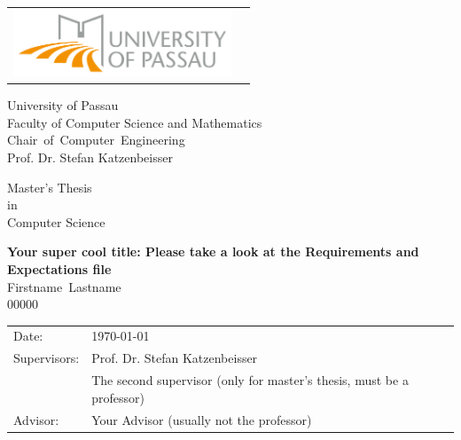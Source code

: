 \documentclass[fontsize=10pt,openright,oneside,paper=a4,BCOR=1cm,numbers=noenddot,english]{scrbook}
\newcommand{\authornamefirst}{Firstname}
\newcommand{\authornamelast}{Lastname}
\newcommand{\matrikelnummer}{00000}
\newcommand{\worktitle}{Your super cool title: Please take a look at the Requirements and Expectations file}
\newcommand{\thesistype}{Master's Thesis}
\newcommand{\courseofstudies}{Computer Science}
\newcommand{\thesisdate}{\today}   %
\newcommand{\thesisprof}{Prof. Dr. Stefan Katzenbeisser}
\newcommand{\thesisproftwo}{The second supervisor (only for master's thesis, must be a professor)}
\newcommand{\chair}{\mbox{Chair of Computer Engineering}}
\newcommand{\advisor}{Your Advisor (usually not the professor)}
\let\epsilon\varepsilon
\begin{document}
\frontmatter
\thispagestyle{empty}
\newpage

\vspace{1cm}

\begin{center}
\begin{tabular}{lr}
\includegraphics[width=6.5cm]{img/logouni_en.png}
\end{tabular}

\vspace{3cm}
\Large University of Passau
\\
\Large Faculty of Computer Science and Mathematics
\\
\vspace{0.3cm}
\Large {\chair }
\\
\Large \thesisprof

\end{center}


\vspace{2.5cm}

\begin{center}
        {\Large \thesistype\\ in\\ \courseofstudies\\} 
\end{center}

\begin{center}
        \settowidth{\baselineskip}{0.4cm}
        {\LARGE \textbf{\worktitle}}
        \\
        {\Large
        \vspace{1cm}
        \authornamefirst~\authornamelast \\ \matrikelnummer \\
        }
\end{center}

\vfill {%

\vfill


{\large
\begin{tabular}[l]{llll}

Date:       & \thesisdate %
\smallskip \\
Supervisors:   & \thesisprof \\ %
	& \thesisproftwo \\
Advisor: & \advisor \\ %
\end{tabular}}
} \cleardoublepage
\end{document}
